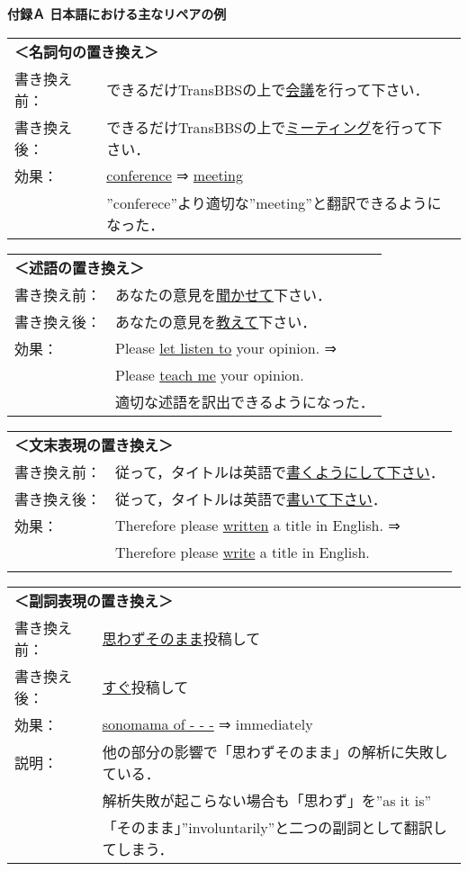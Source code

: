 \appendix
\small

{\bf 付録Ａ 日本語における主なリペアの例}

\vspace*{3mm}
\begin{tabular}{ll}
\multicolumn{2}{l}{\bf ＜名詞句の置き換え＞}   \\
書き換え前： & できるだけTransBBSの上で\underline{会議}を行って下さい．\\
書き換え後： & できるだけTransBBSの上で\underline{ミーティング}を行って下さい．\\
効果： & \underline{conference} ⇒ \underline{meeting} \\
       & ''conferece''より適切な''meeting''と翻訳できるようになった． \\
\end{tabular}

\begin{tabular}{ll}
\multicolumn{2}{l}{\bf ＜述語の置き換え＞}   \\
書き換え前： & あなたの意見を\underline{聞かせて}下さい．\\
書き換え後： & あなたの意見を\underline{教えて}下さい．\\
効果： & Please \underline{let listen to} your opinion. ⇒ \\
       & Please \underline{teach me} your opinion. \\
       & 適切な述語を訳出できるようになった．\\
\end{tabular}

\begin{tabular}{ll}
\multicolumn{2}{l}{\bf ＜文末表現の置き換え＞}   \\
書き換え前： & 従って，タイトルは英語で\underline{書くようにして下さい}．\\
書き換え後： & 従って，タイトルは英語で\underline{書いて下さい}．\\
効果： & Therefore please \underline{written} a title in English. ⇒ \\
       & Therefore please \underline{write} a title in English. \\
       & 
\end{tabular}

\begin{tabular}{ll}
\multicolumn{2}{l}{\bf ＜副詞表現の置き換え＞}   \\
書き換え前： & \underline{思わずそのまま}投稿して \\
書き換え後： & \underline{すぐ}投稿して \\
効果： & \underline{sonomama of - - -} ⇒ {immediately} \\
説明： & 他の部分の影響で「思わずそのまま」の解析に失敗している．\\
       & 解析失敗が起こらない場合も「思わず」を''as it is'' \\
       & 「そのまま」''involuntarily''と二つの副詞として翻訳してしまう．\\
\end{tabular}

